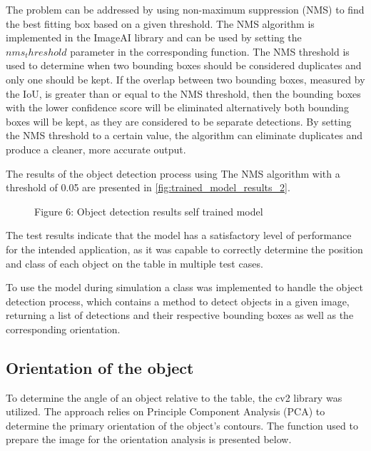 The problem can be addressed by using non-maximum suppression (NMS) to find the best fitting box based on a given threshold. The NMS algorithm is implemented in the ImageAI library and can be used by setting the \(nms_threshold\) parameter in the corresponding function. The NMS threshold is used to determine when two bounding boxes should be considered duplicates and only one should be kept. If the overlap between two bounding boxes, measured by the IoU, is greater than or equal to the NMS threshold, then  the bounding boxes with the lower confidence score will be eliminated alternatively both bounding boxes will be kept, as they are considered to be separate detections. By setting the NMS threshold to a certain value, the algorithm can eliminate duplicates and produce a cleaner, more accurate output. 

The results of the object detection process using The NMS algorithm with a threshold of 0.05 are presented in \vref{fig:trained_model_results_2}.

\begin{figure}[!h]
    \centering
    \caption{Figure 6: Object detection results self trained model }
    \label{fig:trained_model_results_2}
\end{figure}

The test results indicate that the model has a satisfactory level of performance for the intended application, as it was capable to correctly determine the position and class of each object on the table in multiple test cases. 

To use the model during simulation a class was implemented to handle the object detection process, which contains a method to detect objects in a given image, returning a list of detections and their respective bounding boxes as well as the corresponding orientation.

\subsection{Orientation of the object}

To determine the angle of an object relative to the table, the cv2 library was utilized. The approach relies on Principle Component Analysis (PCA) to determine the primary orientation of the object's contours. The function used to prepare the image for the orientation analysis is presented below.

